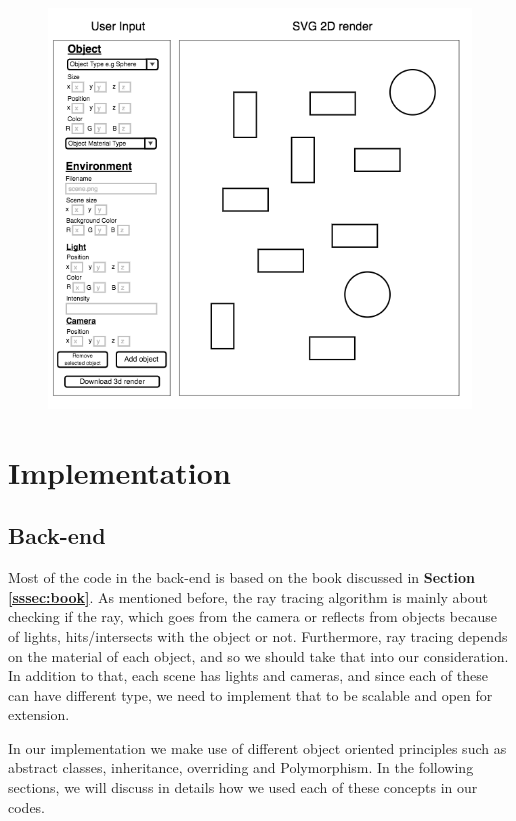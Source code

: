 \documentclass[a4paper]{report}
\begin{document}
	\begin{figure}[h]
		\includegraphics[width=1\textwidth]{second_prototype.png}
	\end{figure}
	
	\chapter{Implementation}
	
	\label{ch:imp}\section{Back-end}
	Most of the code in the back-end is based on the book discussed in \textbf{Section \ref{sssec:book}}. As mentioned before, the ray tracing algorithm is mainly about checking if the ray, which goes from the camera or reflects from objects because of lights, hits/intersects with the object or not. Furthermore, ray tracing depends on the material of each object, and so we should take that into our consideration. In addition to that, each scene has lights and cameras, and since each of these can have different type, we need to implement that to be scalable and open for extension.\\
	\par In our implementation we make use of different object oriented principles such as abstract classes, inheritance, overriding and Polymorphism. In the following sections, we will discuss in details how we used each of these concepts in our codes.
\end{document}

